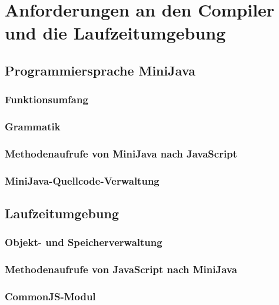 \chapter{Anforderungen an den Compiler und die Laufzeitumgebung}

\section{Programmiersprache MiniJava}
\subsection{Funktionsumfang}
\subsection{Grammatik}
\subsection{Methodenaufrufe von MiniJava nach JavaScript}
\subsection{MiniJava-Quellcode-Verwaltung}

\section{Laufzeitumgebung}
\subsection{Objekt- und Speicherverwaltung}
\subsection{Methodenaufrufe von JavaScript nach MiniJava}
\subsection{CommonJS-Modul}
